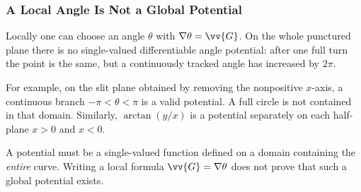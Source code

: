 \subsubsection{A Local Angle Is Not a Global Potential}
\begin{center}
\end{center}
Locally one can choose an angle $\theta$ with $\nabla\theta = \vv{G}$. On the whole punctured plane there is no single-valued differentiable angle potential: after one full turn the point is the same, but a continuously tracked angle has increased by $2\pi$.

For example, on the slit plane obtained by removing the nonpositive $x$-axis, a continuous branch $-\pi < \theta < \pi$ is a valid potential. A full circle is not contained in that domain. Similarly, $\arctan(y/x)$ is a potential separately on each half-plane $x > 0$ and $x < 0$.

\begin{tcolorbox}[colback=orange!5!white,colframe=orange!80!black,title=Check the Domain First]
A potential must be a single-valued function defined on a domain containing the \emph{entire} curve. Writing a local formula $\vv{G} = \nabla\theta$ does not prove that such a global potential exists.
\end{tcolorbox}

\newpage
